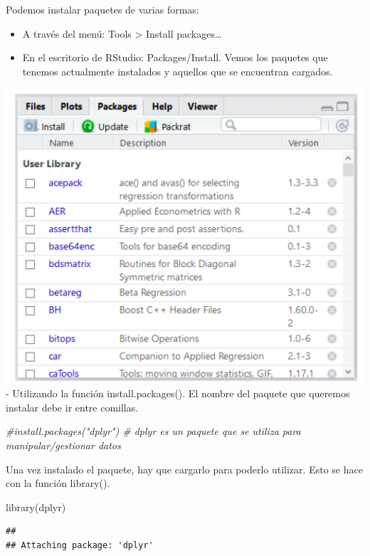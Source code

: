 \documentclass[
]{book}
\newenvironment{Shaded}{\begin{snugshade}}{\end{snugshade}}
\newcommand{\CommentTok}[1]{\textcolor[rgb]{0.56,0.35,0.01}{\textit{#1}}}
\newcommand{\FunctionTok}[1]{\textcolor[rgb]{0.00,0.00,0.00}{#1}}
\newcommand{\NormalTok}[1]{#1}
\begin{document}
Podemos instalar paquetes de varias formas:

\begin{itemize}
\item
  A través del menú: Tools \textgreater{} Install packages\ldots{}
\item
  En el escritorio de RStudio: Packages/Install. Vemos los paquetes que tenemos actualmente instalados y aquellos que se encuentran cargados.
\end{itemize}

\includegraphics{imagenes/10.png}
- Utilizando la función install.packages(). El nombre del paquete que queremos instalar debe ir entre comillas.

\begin{Shaded}
\begin{Highlighting}[]
\CommentTok{\#install.packages("dplyr") \# dplyr es un paquete que se utiliza para manipular/gestionar datos}
\end{Highlighting}
\end{Shaded}

Una vez instalado el paquete, hay que cargarlo para poderlo utilizar. Esto se hace con la función library().

\begin{Shaded}
\begin{Highlighting}[]
\FunctionTok{library}\NormalTok{(dplyr)}
\end{Highlighting}
\end{Shaded}

\begin{verbatim}
## 
## Attaching package: 'dplyr'
\end{verbatim}
\end{document}
